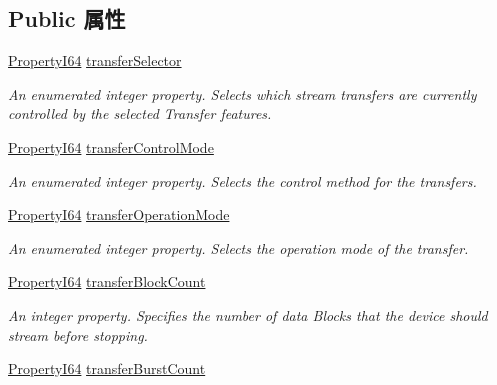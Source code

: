 \subsection*{Public 属性}
\begin{DoxyCompactItemize}
\item 
\hyperlink{group___common_interface_ga81749b2696755513663492664a18a893}{Property\+I64} \hyperlink{classmv_i_m_p_a_c_t_1_1acquire_1_1_gen_i_cam_1_1_transfer_control_a5f03d183d1ae3ff09fa778c468fae095}{transfer\+Selector}
\begin{DoxyCompactList}\small\item\em An enumerated integer property. Selects which stream transfers are currently controlled by the selected Transfer features. \end{DoxyCompactList}\item 
\hyperlink{group___common_interface_ga81749b2696755513663492664a18a893}{Property\+I64} \hyperlink{classmv_i_m_p_a_c_t_1_1acquire_1_1_gen_i_cam_1_1_transfer_control_a32c443f8d4a281c17a6538b2e369839c}{transfer\+Control\+Mode}
\begin{DoxyCompactList}\small\item\em An enumerated integer property. Selects the control method for the transfers. \end{DoxyCompactList}\item 
\hyperlink{group___common_interface_ga81749b2696755513663492664a18a893}{Property\+I64} \hyperlink{classmv_i_m_p_a_c_t_1_1acquire_1_1_gen_i_cam_1_1_transfer_control_a5f60d36f9fab02b1519901c371f376ad}{transfer\+Operation\+Mode}
\begin{DoxyCompactList}\small\item\em An enumerated integer property. Selects the operation mode of the transfer. \end{DoxyCompactList}\item 
\hyperlink{group___common_interface_ga81749b2696755513663492664a18a893}{Property\+I64} \hyperlink{classmv_i_m_p_a_c_t_1_1acquire_1_1_gen_i_cam_1_1_transfer_control_a67b449afd5b111ba4b2d6fe6c3e3abcd}{transfer\+Block\+Count}
\begin{DoxyCompactList}\small\item\em An integer property. Specifies the number of data Blocks that the device should stream before stopping. \end{DoxyCompactList}\item 
\hyperlink{group___common_interface_ga81749b2696755513663492664a18a893}{Property\+I64} \hyperlink{classmv_i_m_p_a_c_t_1_1acquire_1_1_gen_i_cam_1_1_transfer_control_a58f6ddf7cff063b677c1c6642f9b86c7}{transfer\+Burst\+Count}

\end{DoxyCompactItemize}
